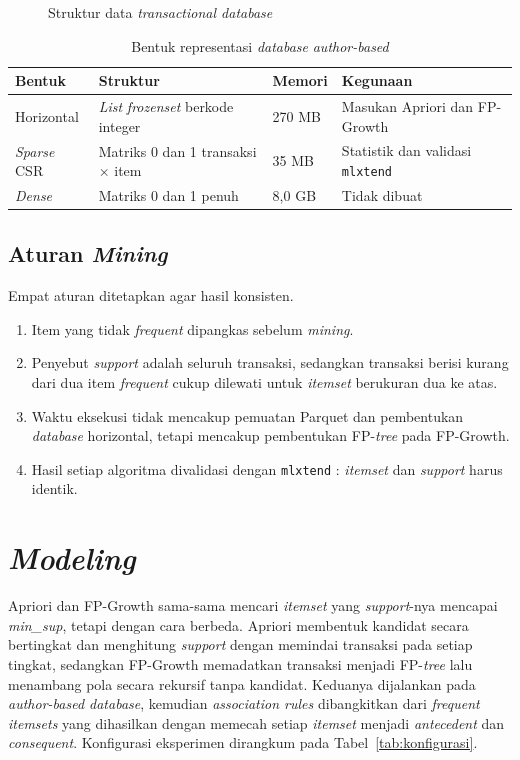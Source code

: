 \begin{figure}[!htb]
\centering
{}
\caption{Struktur data \textit{transactional database}}
\label{fig:satu-sumber}
\end{figure}

\begin{table}[!htb]
\caption{Bentuk representasi \textit{database} \textit{author-based}}
\label{tab:bentuk}
\small
\begin{tabularx}{\textwidth}{@{}p{2.8cm}XlX@{}}
\toprule
\textbf{Bentuk} & \textbf{Struktur} & \textbf{Memori} & \textbf{Kegunaan} \\
\midrule
Horizontal & \textit{List} \textit{frozenset} berkode integer & 270 MB & Masukan Apriori dan FP-Growth \\
\midrule
\textit{Sparse} CSR & Matriks 0 dan 1 transaksi $\times$ item & 35 MB & Statistik dan validasi \texttt{mlxtend} \\
\midrule
\textit{Dense} & Matriks 0 dan 1 penuh & 8,0 GB & Tidak dibuat \\
\bottomrule
\end{tabularx}
\end{table}

\subsection{Aturan \textit{Mining}}
\label{sec:aturan-mining}
Empat aturan ditetapkan agar hasil konsisten.
\begin{enumerate}
\item Item yang tidak \textit{frequent} dipangkas sebelum \textit{mining}.
\item Penyebut \textit{support} adalah seluruh transaksi, sedangkan transaksi berisi kurang dari dua item \textit{frequent} cukup dilewati untuk \textit{itemset} berukuran dua ke atas.
\item Waktu eksekusi tidak mencakup pemuatan Parquet dan pembentukan \textit{database} horizontal, tetapi mencakup pembentukan FP-\textit{tree} pada FP-Growth.
\item Hasil setiap algoritma divalidasi dengan \texttt{mlxtend} \cite{raschka2018}: \textit{itemset} dan \textit{support} harus identik.
\end{enumerate}

\section{\textit{Modeling}}
Apriori dan FP-Growth sama-sama mencari \textit{itemset} yang \textit{support}-nya mencapai \textit{min\_sup}, tetapi dengan cara berbeda. Apriori membentuk kandidat secara bertingkat dan menghitung \textit{support} dengan memindai transaksi pada setiap tingkat, sedangkan FP-Growth memadatkan transaksi menjadi FP-\textit{tree} lalu menambang pola secara rekursif tanpa kandidat. Keduanya dijalankan pada \textit{author-based database}, kemudian \textit{association rules} dibangkitkan dari \textit{frequent itemsets} yang dihasilkan dengan memecah setiap \textit{itemset} menjadi \textit{antecedent} dan \textit{consequent}. Konfigurasi eksperimen dirangkum pada Tabel~\ref{tab:konfigurasi}.

